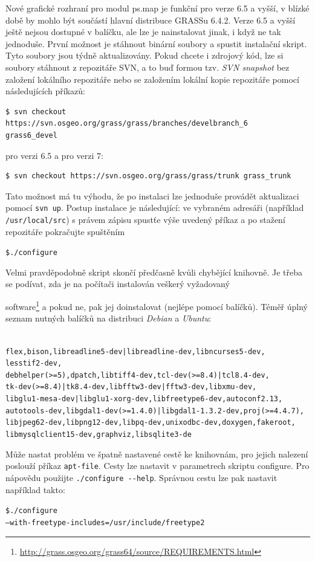 \documentclass[a4paper,12pt,draft]{article}
\begin{document}
{Nové grafické rozhraní pro modul ps.map je funkční pro verze 6.5
a vyšší, v blízké době by mohlo být součástí hlavní distribuce GRASSu 6.4.2.
Verze 6.5 a vyšší ještě nejsou dostupné v balíčku, ale lze je nainstalovat
jinak,
i když ne tak jednoduše. První možnost je stáhnout binární soubory  a
spustit instalační skript. Tyto soubory jsou týdně aktualizovány. Pokud
chcete i zdrojový kód, lze si soubory stáhnout z repozitáře SVN, a to buď
formou tzv. \emph{SVN snapshot} bez založení lokálního repozitáře nebo
se založením lokální kopie repozitáře pomocí následujících příkazů:
\begin{footnotesize}
\begin{verbatim}
$ svn checkout https://svn.osgeo.org/grass/grass/branches/develbranch_6
grass6_devel
\end{verbatim}
\end{footnotesize}
pro verzi 6.5 a pro verzi 7:
\begin{footnotesize}
\begin{verbatim}
$ svn checkout https://svn.osgeo.org/grass/grass/trunk grass_trunk
\end{verbatim}
\end{footnotesize}
Tato možnost má tu výhodu, že po instalaci lze jednoduše provádět
aktualizaci pomocí \verb|svn up|. Postup instalace je následující: ve
vybraném adresáři (například \verb|/usr/local/src|) s právem zápisu
spustťe výše uvedený příkaz a po stažení repozitáře pokračujte
spuštěním
\begin{alltt}
{\footnotesize \$ ./configure}
\end{alltt}
Velmi pravděpodobně skript skončí předčasně
kvůli chybějící knihovně. Je třeba se podívat,
zda je na počítači instalován veškerý vyžadovaný

software\footnote{\url{http://grass.osgeo.org/grass64/source/REQUIREMENTS.html}}
a pokud ne, pak jej doinstalovat (nejlépe pomocí balíčků). Téměř
úplný seznam nutných balíčků na distribuci \emph{Debian} a \emph{Ubuntu}:
\begin{alltt}
{\footnotesize
flex, bison, libreadline5-dev | libreadline-dev, libncurses5-dev,
lesstif2-dev,
debhelper (>= 5), dpatch, libtiff4-dev, tcl-dev (>= 8.4) | tcl8.4-dev,
tk-dev (>= 8.4) | tk8.4-dev, libfftw3-dev|fftw3-dev, libxmu-dev,
libglu1-mesa-dev | libglu1-xorg-dev, libfreetype6-dev, autoconf2.13,
autotools-dev, libgdal1-dev (>=1.4.0) | libgdal1-1.3.2-dev, proj (>= 4.4.7),
libjpeg62-dev, libpng12-dev, libpq-dev, unixodbc-dev, doxygen, fakeroot,
libmysqlclient15-dev, graphviz, libsqlite3-de
}
\end{alltt}
Může nastat problém ve špatně nastavené cestě ke knihovnám, pro
jejich nalezení poslouží příkaz \verb|apt-file|. Cesty lze nastavit v
parametrech skriptu configure.
Pro nápovědu použijte \verb|./configure --help|.
Správnou cestu lze pak nastavit například takto:
\begin{alltt}
{\footnotesize \$ ./configure
--with-freetype-includes=/usr/include/freetype2
}
\end{alltt}

}
\end{document}
